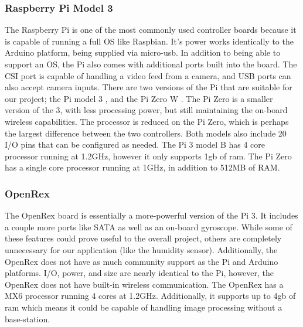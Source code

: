 \documentclass[letterpaper, 10, draftclsnofoot, onecolumn]{IEEEtran}
\begin{document}

\subsubsection{Raspberry Pi Model 3}

The Raspberry Pi is one of the most commonly used controller boards 
because it is capable of running a full OS like Raspbian. It's 
power works identically to the Arduino platform, being supplied via 
micro-usb. In addition to being able to support an OS, the Pi also 
comes with additional ports built into the board. The CSI port is 
capable of handling a video feed from a camera, and USB ports can 
also accept camera inputs. There are two versions of the Pi that 
are suitable for our project; the Pi model 3 \cite{r2}, and 
the Pi Zero W \cite{r3}. The Pi Zero is a smaller version of the 3, 
with less processing power, but still maintaining the on-board 
wireless capabilities. 
The processor is reduced on the Pi Zero, which is perhaps the 
largest difference between the two controllers. Both models also 
include 20 I/O pins that can be configured as needed. The Pi 3 
model B has 4 core processor running at 1.2GHz, however it only 
supports 1gb of ram. The Pi Zero has a single core processor 
running at 1GHz, in addition to 512MB of RAM.   




\subsubsection{OpenRex}


The OpenRex\cite{r4} board is essentially a more-powerful version 
of the Pi 3. It includes a couple more ports like SATA as well as 
an on-board gyroscope. 
While some of these features could prove useful to the 
overall project, others are completely unnecessary for our 
application (like the humidity sensor). Additionally, the OpenRex 
does not have as much community support as the Pi and Arduino 
platforms. I/O, power, and size are nearly identical to the Pi, 
however, the OpenRex does not have built-in wireless communication. 
The OpenRex has a MX6 processor running 4 cores at 1.2GHz. 
Additionally, it supports up to 4gb of ram which means it could be 
capable of handling image processing without a base-station.  
\end{document}
